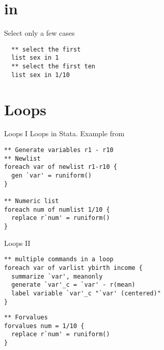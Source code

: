\section{in}
\begin{frame}[fragile]{in}
Select only a few cases 
\begin{lstlisting}
  ** select the first
  list sex in 1
  ** select the first ten
  list sex in 1/10
\end{lstlisting}

\end{frame}


\section{Loops}
\begin{frame}[fragile]{Loops I}  
Loops in Stata. Example from \textcite[61ff.]{Kohler12en}
\begin{lstlisting}
** Generate variables r1 - r10
** Newlist
foreach var of newlist r1-r10 {
  gen `var' = runiform()
}

** Numeric list
foreach num of numlist 1/10 {
  replace r`num' = runiform()
}
\end{lstlisting}
\end{frame}

\begin{frame}[fragile]{Loops II}   
\begin{lstlisting}
** multiple commands in a loop
foreach var of varlist ybirth income {
  summarize `var', meanonly
  generate `var'_c = `var' - r(mean)
  label variable `var'_c "`var' (centered)"
}
\end{lstlisting}

\begin{lstlisting}
** Forvalues
forvalues num = 1/10 {
  replace r`num' = runiform()
}
\end{lstlisting}
\end{frame}

